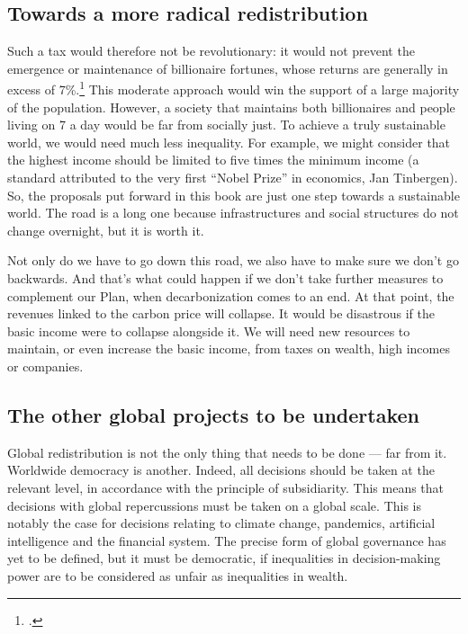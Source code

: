 \documentclass[a5paper,english,openany]{memoir}
\begin{document}
\subsection{Towards a more radical redistribution}
Such a tax would therefore not be revolutionary: it would not prevent the emergence or maintenance of billionaire fortunes, whose returns are generally in excess of 7\%.\footnote{\cite{chancel_world_2022}.}  
This moderate approach would win the support of a large majority of the population. However, a society that maintains both billionaires and people living on \textit{\texteuro{}}7 a day would be far from socially just. To achieve a truly sustainable world, we would need much less inequality. %
For example, we might consider that the highest income should be limited to five times the minimum income (a standard attributed to the very first ``Nobel Prize'' in economics, Jan Tinbergen). So, the proposals put forward in this book are just one step towards a sustainable world. The road is a long one because infrastructures and social structures do not change overnight, %
but it is worth it.  

Not only do we have to go down this road, we also have to make sure we don't go backwards. And that's %
what could happen if we don't take further measures to complement our Plan, when decarbonization comes to an end. %
At that point, the revenues linked to the carbon price will collapse. It would be disastrous if the basic income were to collapse alongside it. %
We will need new resources %
to maintain, or even increase  %
the basic income, 
from taxes on wealth, high incomes or companies. 

\subsection{The other global projects to be undertaken}
Global redistribution is not the only thing that needs to be done --- far from it. %
Worldwide %
democracy is another. %
Indeed, all decisions should be taken at the relevant level, in accordance with the principle of subsidiarity. This means that decisions with global repercussions must be taken on a global scale. %
This is notably the case for decisions relating to climate change, pandemics, artificial intelligence and the financial system. %
The precise form of global governance has yet to be defined, but it must be democratic, if inequalities in decision-making power are to be considered as unfair as inequalities in wealth. %
\end{document}
